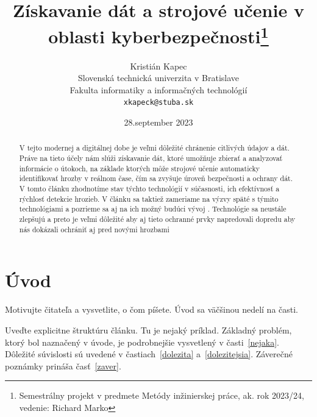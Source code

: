 \documentclass[10pt,twocolumn,twoside,slovak,a4paper]{article}
\title{Získavanie dát a strojové učenie v oblasti kyberbezpečnosti\thanks{Semestrálny projekt v predmete Metódy inžinierskej práce, ak. rok 2023/24, vedenie: Richard Marko}} %
\author{Kristián Kapec\\[2pt]
	{\small Slovenská technická univerzita v Bratislave}\\
	{\small Fakulta informatiky a informačných technológií}\\
	{\small \texttt{xkapeck@stuba.sk}}
	}
\date{\small 28.september 2023} %
\begin{document}
\maketitle

\begin{abstract}
V tejto modernej a digitálnej dobe je veľmi dôležité chránenie citlivých údajov a dát. Práve na tieto účely nám slúži získavanie dát, ktoré umožňuje zbierať a analyzovať informácie o útokoch, na základe ktorých môže strojové učenie automaticky identifikovať hrozby v reálnom čase, čím sa zvyšuje úroveň bezpečnosti a ochrany dát.  V tomto článku zhodnotíme stav týchto technológií v súčasnosti, ich efektívnosť a rýchlosť detekcie hrozieb. V článku sa taktiež zameriame na výzvy späté s týmito technológiami a pozrieme sa aj na ich možný budúci vývoj . Technológie sa neustále zlepšujú a preto je veľmi dôležité aby aj tieto ochranné prvky napredovali dopredu aby nás dokázali ochrániť aj pred novými hrozbami
\end{abstract}



\section{Úvod}

Motivujte čitateľa a vysvetlite, o čom píšete. Úvod sa väčšinou nedelí na časti.

Uveďte explicitne štruktúru článku. Tu je nejaký príklad.
Základný problém, ktorý bol naznačený v úvode, je podrobnejšie vysvetlený v časti~\ref{nejaka}.
Dôležité súvislosti sú uvedené v častiach~\ref{dolezita} a~\ref{dolezitejsia}.
Záverečné poznámky prináša časť~\ref{zaver}.
\end{document}
